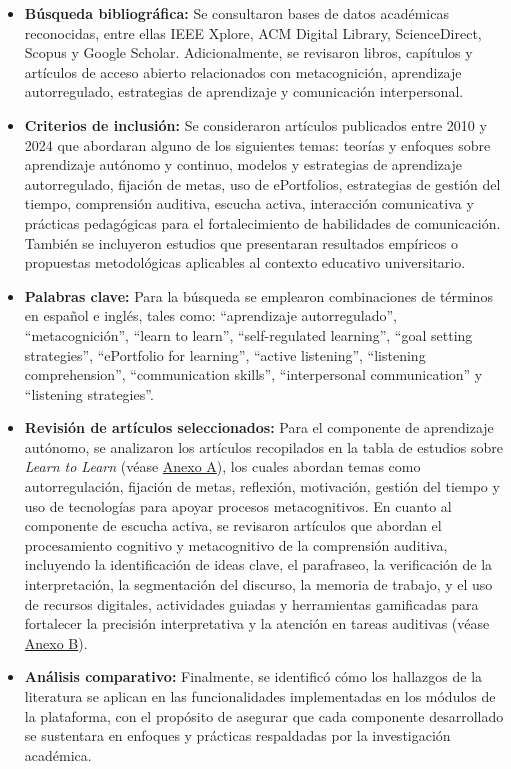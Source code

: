 \begin{itemize}
    \item \textbf{Búsqueda bibliográfica:} Se consultaron bases de datos académicas reconocidas, entre ellas IEEE Xplore, ACM Digital Library, ScienceDirect, Scopus y Google Scholar. Adicionalmente, se revisaron libros, capítulos y artículos de acceso abierto relacionados con metacognición, aprendizaje autorregulado, estrategias de aprendizaje y comunicación interpersonal.

    \item \textbf{Criterios de inclusión:} Se consideraron artículos publicados entre 2010 y 2024 que abordaran alguno de los siguientes temas: teorías y enfoques sobre aprendizaje autónomo y continuo, modelos y estrategias de aprendizaje autorregulado, fijación de metas, uso de ePortfolios, estrategias de gestión del tiempo, comprensión auditiva, escucha activa, interacción comunicativa y prácticas pedagógicas para el fortalecimiento de habilidades de comunicación. También se incluyeron estudios que presentaran resultados empíricos o propuestas metodológicas aplicables al contexto educativo universitario.

    \item \textbf{Palabras clave:} Para la búsqueda se emplearon combinaciones de términos en español e inglés, tales como: “aprendizaje autorregulado”, “metacognición”, “learn to learn”, “self-regulated learning”, “goal setting strategies”, “ePortfolio for learning”, “active listening”, “listening comprehension”, “communication skills”, “interpersonal communication” y “listening strategies”.

    \item \textbf{Revisión de artículos seleccionados:} Para el componente de aprendizaje autónomo, se analizaron los artículos recopilados en la tabla de estudios sobre \textit{Learn to Learn} (véase \hyperref[anexo:learn_to_learn]{Anexo A}), los cuales abordan temas como autorregulación, fijación de metas, reflexión, motivación, gestión del tiempo y uso de tecnologías para apoyar procesos metacognitivos. En cuanto al componente de escucha activa, se revisaron artículos que abordan el procesamiento cognitivo y metacognitivo de la comprensión auditiva, incluyendo la identificación de ideas clave, el parafraseo, la verificación de la interpretación, la segmentación del discurso, la memoria de trabajo, y el uso de recursos digitales, actividades guiadas y herramientas gamificadas para fortalecer la precisión interpretativa y la atención en tareas auditivas (véase \hyperref[anexo:escucha_activa]{Anexo B}).

    \item \textbf{Análisis comparativo:} Finalmente, se identificó cómo los hallazgos de la literatura se aplican en las funcionalidades implementadas en los módulos de la plataforma, con el propósito de asegurar que cada componente desarrollado se sustentara en enfoques y prácticas respaldadas por la investigación académica.
\end{itemize}

